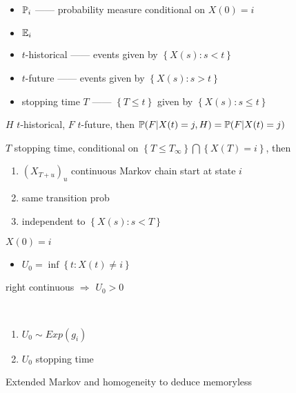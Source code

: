 \begin{itemize}
    \item $\mathbb{P}_i$ ------ probability measure conditional on $X(0) = i$
    \item $\mathbb{E}_i$
    \item $t$-historical ------ events given by $\left\{ X(s) : s < t \right\}$
    \item $t$-future ------ events given by $\left\{ X(s) : s > t \right\}$
    \item stopping time $T$ ------ $\left\{ T \leq t \right\}$ given by $\left\{ X(s) : s \leq t \right\}$
\end{itemize}

\begin{thm}
    $H$ $t$-historical, $F$ $t$-future, then $\mathbb{P}(F|X(t) = j, H) = \mathbb{P}(F | X(t) = j)$
\end{thm}

\begin{thm}
    $T$ stopping time, conditional on $\left\{ T \leq T_\infty \right\} \bigcap \left\{ X(T) = i \right\}$, then
    \begin{enumerate}
        \item $(X_{T + u})_u$ continuous Markov chain start at state $i$
        \item same transition prob
        \item independent to $\left\{ X(s) : s < T \right\}$
    \end{enumerate}
\end{thm}

\begin{setting}
    $X(0) = i$
\end{setting}

\begin{itemize}
    \item $U_0 = \inf \left\{ t : X(t) \neq i \right\}$
\end{itemize}

\begin{fact}
    right continuous $\Rightarrow$ $U_0 > 0$
\end{fact}

\begin{thm}\,
    \begin{enumerate}
        \item $U_0 \sim Exp(g_i)$
        \item $U_0$ stopping time
    \end{enumerate}
\end{thm}
\begin{pf}
    Extended Markov and homogeneity to deduce memoryless
\end{pf}


